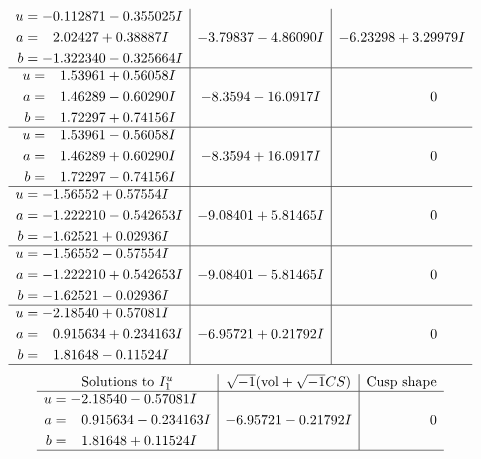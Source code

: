 \documentclass[1p]{elsarticle_modified}
\theoremstyle{definition}
\newcommand{\I}{\sqrt{-1}}
\begin{document}
$$\begin{array}{c|c|c}
\begin{aligned}
u &= -0.112871 - 0.355025 I \\
a &= \phantom{-}2.02427 + 0.38887 I \\
b &= -1.322340 - 0.325664 I\end{aligned}
 & -3.79837 - 4.86090 I & -6.23298 + 3.29979 I \\ \hline\begin{aligned}
u &= \phantom{-}1.53961 + 0.56058 I \\
a &= \phantom{-}1.46289 - 0.60290 I \\
b &= \phantom{-}1.72297 + 0.74156 I\end{aligned}
 & -8.3594 - 16.0917 I & \phantom{-0.000000 } 0 \\ \hline\begin{aligned}
u &= \phantom{-}1.53961 - 0.56058 I \\
a &= \phantom{-}1.46289 + 0.60290 I \\
b &= \phantom{-}1.72297 - 0.74156 I\end{aligned}
 & -8.3594 + 16.0917 I & \phantom{-0.000000 } 0 \\ \hline\begin{aligned}
u &= -1.56552 + 0.57554 I \\
a &= -1.222210 - 0.542653 I \\
b &= -1.62521 + 0.02936 I\end{aligned}
 & -9.08401 + 5.81465 I & \phantom{-0.000000 } 0 \\ \hline\begin{aligned}
u &= -1.56552 - 0.57554 I \\
a &= -1.222210 + 0.542653 I \\
b &= -1.62521 - 0.02936 I\end{aligned}
 & -9.08401 - 5.81465 I & \phantom{-0.000000 } 0 \\ \hline\begin{aligned}
u &= -2.18540 + 0.57081 I \\
a &= \phantom{-}0.915634 + 0.234163 I \\
b &= \phantom{-}1.81648 - 0.11524 I\end{aligned}
 & -6.95721 + 0.21792 I & \phantom{-0.000000 } 0\\
 \hline 
 \end{array}$$\newpage$$\begin{array}{c|c|c}  
\text{Solutions to }I^u_{1}& \I (\text{vol} + \sqrt{-1}CS) & \text{Cusp shape}\\
 \hline 
\begin{aligned}
u &= -2.18540 - 0.57081 I \\
a &= \phantom{-}0.915634 - 0.234163 I \\
b &= \phantom{-}1.81648 + 0.11524 I\end{aligned}
 & -6.95721 - 0.21792 I & \phantom{-0.000000 } 0\\
 \hline 
 \end{array}$$\newpage\newpage\renewcommand{\arraystretch}{1}
\end{document}
